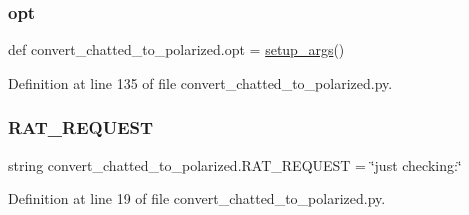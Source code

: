 \subsubsection{\texorpdfstring{opt}{opt}}
{\footnotesize\ttfamily def convert\+\_\+chatted\+\_\+to\+\_\+polarized.\+opt = \hyperlink{namespaceconvert__chatted__to__polarized_a1318d32a7ea5fa636f9e29e8e92b2833}{setup\+\_\+args}()}



Definition at line 135 of file convert\+\_\+chatted\+\_\+to\+\_\+polarized.\+py.

\mbox{\label{namespaceconvert__chatted__to__polarized_ac07ae61db0ef5d7b1b9b20fc2d85aae5}} 
\subsubsection{\texorpdfstring{R\+A\+T\+\_\+\+R\+E\+Q\+U\+E\+ST}{RAT\_REQUEST}}
{\footnotesize\ttfamily string convert\+\_\+chatted\+\_\+to\+\_\+polarized.\+R\+A\+T\+\_\+\+R\+E\+Q\+U\+E\+ST = \char`\"{}just checking\+:\char`\"{}}



Definition at line 19 of file convert\+\_\+chatted\+\_\+to\+\_\+polarized.\+py.

